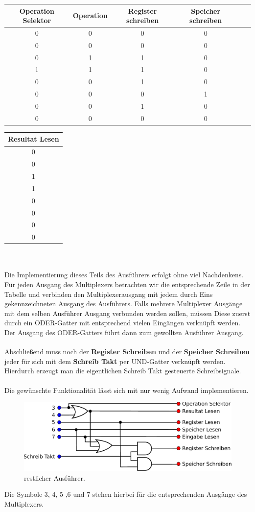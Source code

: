 \documentclass[11pt,a4paper,leqno]{report}
\numberwithin{equation}{chapter}
\begin{document}
\begin{center}
	\begin{tabular}{|c|c|c|c|c|c|}
		Operation Selektor & Operation & Register schreiben & Speicher schreiben \\
		\hline
		0 & 0 & 0 & 0\\
		0 & 0 & 0 & 0\\
		0 & 1 & 1 & 0\\
		1 & 1 & 1 & 0\\
		0 & 0 & 1 & 0\\
		0 & 0 & 0 & 1\\
		0 & 0 & 1 & 0\\
		0 & 0 & 0 & 0\\
	\end{tabular}  
\end{center}
\begin{tabular}{|c|}
		Resultat Lesen \\
		\hline
		0\\
		0\\
		1\\
		1\\
		0\\
		0\\
		0\\
		0\\
\end{tabular}\\  
\\
Die Implementierung dieses Teils des Ausf\"uhrers erfolgt ohne viel Nachdenkens. Für jeden Ausgang des Multiplexers betrachten wir die entsprechende Zeile in der Tabelle und verbinden den Multiplexerausgang mit jedem durch Eins gekennzeichneten Ausgang des Ausf\"uhrers.
Falls mehrere Multiplexer Ausg\"ange mit dem selben Ausf\"uhrer Ausgang verbunden werden sollen, m\"ussen Diese zuerst durch ein ODER-Gatter mit entsprechend vielen Eing\"angen verkn\"upft werden. Der Ausgang des ODER-Gatters f\"uhrt dann zum gewollten Ausf\"uhrer Ausgang.\\
\\
Abschlie\ss{}end muss noch der \textbf{Register Schreiben} und der \textbf{Speicher Schreiben} jeder f\"ur sich mit dem \textbf{Schreib Takt} per UND-Gatter verkn\"upft werden. Hierdurch erzeugt man die eigentlichen Schreib Takt gesteuerte Schreibsignale.\\
\\
Die gew\"unschte Funktionalit\"at l\"asst sich mit nur wenig Aufwand implementieren.
\begin{figure}[H]
	\begin{center}
		\includegraphics[scale=0.7]{Bilder/aus_2.pdf}
		\caption{restlicher Ausf\"uhrer.}
	\end{center}
\end{figure}
\noindent
Die Symbole 3, 4, 5 ,6 und 7 stehen hierbei f\"ur die entsprechenden Ausg\"ange des Multiplexers.
\end{document}
